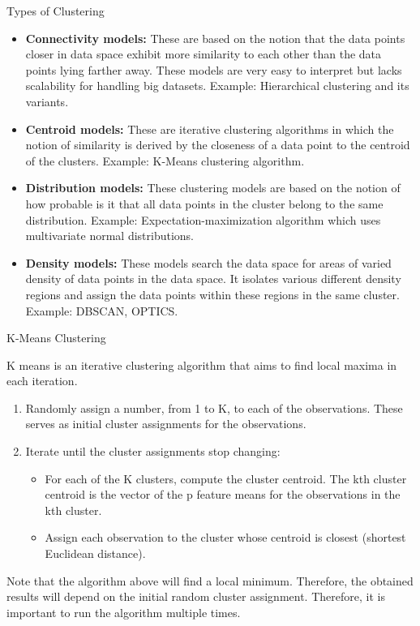 \documentclass{beamer}
\begin{document}
\begin{frame}{Types of Clustering}
\begin{flushleft}
	\begin{itemize}
		\item \textbf{Connectivity models:} These are based on the notion that the data points closer in data space exhibit more similarity to each other than the data points lying farther away. These models are very easy to interpret but lacks scalability for handling big datasets. Example: Hierarchical clustering and its variants.
		\item \textbf{Centroid models:} These are iterative clustering algorithms in which the notion of similarity is derived by the closeness of a data point to the centroid of the clusters. Example: K-Means clustering algorithm.
		\item \textbf{Distribution models:} These clustering models are based on the notion of how probable is it that all data points in the cluster belong to the same distribution. Example: Expectation-maximization algorithm which uses multivariate normal distributions.
		\item \textbf{Density models:} These models search the data space for areas of varied density of data points in the data space. It isolates various different density regions and assign the data points within these regions in the same cluster. Example: DBSCAN, OPTICS.
	\end{itemize}
\end{flushleft}
\end{frame}

\begin{frame}{K-Means Clustering}
	\begin{flushleft}
		K means is an iterative clustering algorithm that aims to find local maxima in each iteration.
		\begin{enumerate}
			\item Randomly assign a number, from 1 to K, to each of the observations. These serves as initial cluster assignments for the observations.
			\item Iterate until the cluster assignments stop changing:
			\begin{itemize}
				\item For each of the K clusters, compute the cluster centroid. The kth cluster centroid is the vector of the p feature means for the observations in the kth cluster.
				\item Assign each observation to the cluster whose centroid is closest (shortest Euclidean distance).
			\end{itemize}
		\end{enumerate}
		Note that the algorithm above will find a local minimum. Therefore, the obtained results will depend on the initial random cluster assignment. Therefore, it is important to run the algorithm multiple times.
\end{flushleft}
\end{frame}
\end{document}
